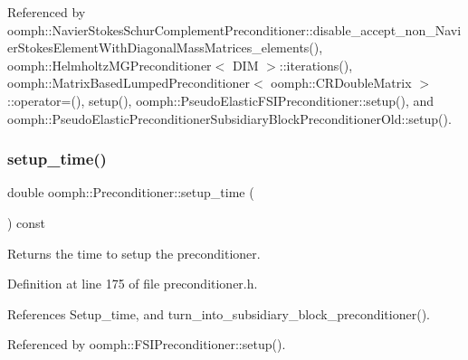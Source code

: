 Referenced by oomph\+::\+Navier\+Stokes\+Schur\+Complement\+Preconditioner\+::disable\+\_\+accept\+\_\+non\+\_\+\+Navier\+Stokes\+Element\+With\+Diagonal\+Mass\+Matrices\+\_\+elements(), oomph\+::\+Helmholtz\+M\+G\+Preconditioner$<$ D\+I\+M $>$\+::iterations(), oomph\+::\+Matrix\+Based\+Lumped\+Preconditioner$<$ oomph\+::\+C\+R\+Double\+Matrix $>$\+::operator=(), setup(), oomph\+::\+Pseudo\+Elastic\+F\+S\+I\+Preconditioner\+::setup(), and oomph\+::\+Pseudo\+Elastic\+Preconditioner\+Subsidiary\+Block\+Preconditioner\+Old\+::setup().

\mbox{\label{classoomph_1_1Preconditioner_a9202e15534f063a8e21a8a60623eac9f}} 
\subsubsection{\texorpdfstring{setup\+\_\+time()}{setup\_time()}}
{\footnotesize\ttfamily double oomph\+::\+Preconditioner\+::setup\+\_\+time (\begin{DoxyParamCaption}{ }\end{DoxyParamCaption}) const\hspace{0.3cm}{\ttfamily [inline]}}



Returns the time to setup the preconditioner. 



Definition at line 175 of file preconditioner.\+h.



References Setup\+\_\+time, and turn\+\_\+into\+\_\+subsidiary\+\_\+block\+\_\+preconditioner().



Referenced by oomph\+::\+F\+S\+I\+Preconditioner\+::setup().

\mbox{\label{classoomph_1_1Preconditioner_a1183f65956ef8a5b332a1246f418e907}} 
